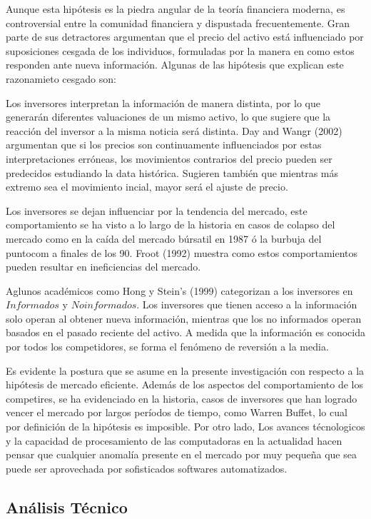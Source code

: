 \documentclass[a4paper,12pt]{Latex/Classes/PhDthesisPSnPDF}
\begin{document}
Aunque esta hipótesis es la piedra angular de la teoría financiera moderna, es controversial entre la comunidad financiera y dispustada frecuentemente. Gran parte de sus detractores argumentan que el precio del activo está influenciado por suposiciones cesgada de los individuos, formuladas por la manera en como estos responden ante nueva información. Algunas de las hipótesis que explican este razonamieto cesgado son: 

Los inversores interpretan la información de manera distinta, por lo que generarán diferentes valuaciones de un mismo activo, lo que sugiere que la reacción del inversor a la misma noticia será distinta. Day and Wangr (2002) argumentan que si los precios son continuamente influenciados por estas interpretaciones erróneas, los movimientos contrarios del precio pueden ser predecidos estudiando la data histórica. Sugieren también que mientras más extremo sea el movimiento incial, mayor será el ajuste de precio.

Los inversores se dejan influenciar por la tendencia del mercado, este comportamiento se ha visto a lo largo de la historia en casos de colapso del mercado como en la caída del mercado búrsatil en 1987 ó la burbuja del puntocom a finales de los 90. Froot (1992) muestra como estos comportamientos pueden resultar en ineficiencias del mercado.

Aglunos académicos como Hong y Stein's (1999) categorizan a los inversores en $Informados$ y $No informados$. Los inversores que tienen acceso a la información solo operan al obtener nueva información, mientras que los no informados operan basados en el pasado reciente del activo. A medida que la información es conocida por todos los competidores, se forma el fenómeno de reversión a la media.

Es evidente la postura que se asume en la presente investigación con respecto a la hipótesis de mercado eficiente. Además de los aspectos del comportamiento de los competires, se ha evidenciado en la historia, casos de inversores que han logrado vencer el mercado por largos períodos de tiempo, como Warren Buffet, lo cual por definición de la hipótesis es imposible. Por otro lado, Los avances técnologicos y la capacidad de procesamiento de las computadoras en la actualidad hacen pensar que cualquier anomalía presente en el mercado por muy pequeña que sea puede ser aprovechada por sofisticados softwares automatizados.

\subsection{Análisis Técnico}
\end{document}
